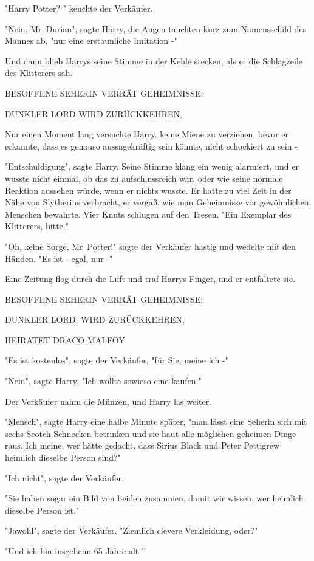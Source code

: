 {"Harry Potter? " keuchte der Verkäufer.

"Nein, Mr~Durian", sagte Harry, die Augen tauchten kurz zum Namensschild des Mannes ab, "nur eine erstaunliche Imitation -"

Und dann blieb Harrys seine Stimme in der Kehle stecken, als er die Schlagzeile des Klitterers sah.

BESOFFENE SEHERIN VERRÄT GEHEIMNISSE:

DUNKLER LORD WIRD ZURÜCKKEHREN,

Nur einen Moment lang versuchte Harry, keine Miene zu verziehen, bevor er erkannte, dass es genauso aussagekräftig sein könnte, nicht schockiert zu sein -

"Entschuldigung", sagte Harry. Seine Stimme klang ein wenig alarmiert, und er wusste nicht einmal, ob das zu aufschlussreich war, oder wie seine normale Reaktion aussehen würde, wenn er nichts wusste. Er hatte zu viel Zeit in der Nähe von Slytherins verbracht, er vergaß, wie man Geheimnisse vor gewöhnlichen Menschen bewahrte. Vier Knuts schlugen auf den Tresen. "Ein Exemplar des Klitterers, bitte."

"Oh, keine Sorge, Mr~Potter!" sagte der Verkäufer hastig und wedelte mit den Händen. "Es ist - egal, nur -"

Eine Zeitung flog durch die Luft und traf Harrys Finger, und er entfaltete sie.

BESOFFENE SEHERIN VERRÄT GEHEIMNISSE:

DUNKLER LORD, WIRD ZURÜCKKEHREN,

HEIRATET DRACO MALFOY

"Es ist kostenlos", sagte der Verkäufer, "für Sie, meine ich -"

"Nein", sagte Harry, "Ich wollte sowieso eine kaufen."

Der Verkäufer nahm die Münzen, und Harry las weiter.

"Mensch", sagte Harry eine halbe Minute später, "man lässt eine Seherin sich mit sechs Scotch-Schnecken betrinken und sie haut alle möglichen geheimen Dinge raus. Ich meine, wer hätte gedacht, dass Sirius Black und Peter Pettigrew heimlich dieselbe Person sind?"

"Ich nicht", sagte der Verkäufer.

"Sie haben sogar ein Bild von beiden zusammen, damit wir wissen, wer heimlich dieselbe Person ist."

"Jawohl", sagte der Verkäufer. "Ziemlich clevere Verkleidung, oder?"

"Und ich bin insgeheim 65 Jahre alt."

}
